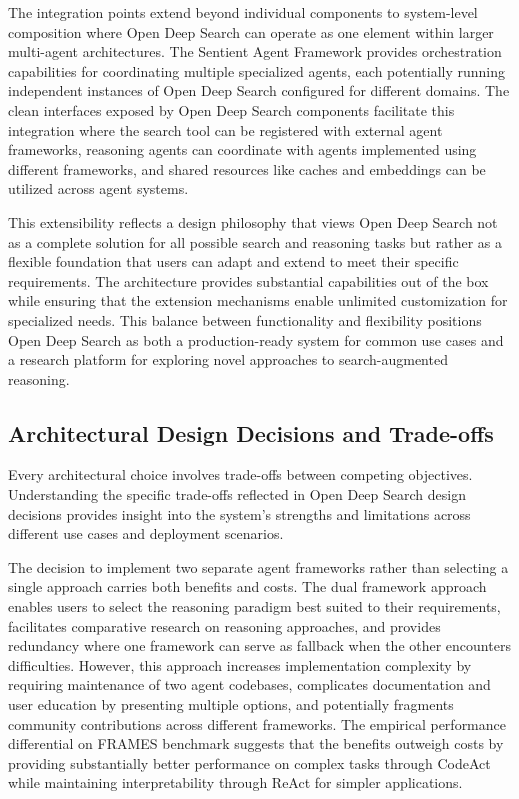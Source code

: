 The integration points extend beyond individual components to system-level composition where Open Deep Search can operate as one element within larger multi-agent architectures. The Sentient Agent Framework provides orchestration capabilities for coordinating multiple specialized agents, each potentially running independent instances of Open Deep Search configured for different domains. The clean interfaces exposed by Open Deep Search components facilitate this integration where the search tool can be registered with external agent frameworks, reasoning agents can coordinate with agents implemented using different frameworks, and shared resources like caches and embeddings can be utilized across agent systems.

This extensibility reflects a design philosophy that views Open Deep Search not as a complete solution for all possible search and reasoning tasks but rather as a flexible foundation that users can adapt and extend to meet their specific requirements. The architecture provides substantial capabilities out of the box while ensuring that the extension mechanisms enable unlimited customization for specialized needs. This balance between functionality and flexibility positions Open Deep Search as both a production-ready system for common use cases and a research platform for exploring novel approaches to search-augmented reasoning.

\subsection{Architectural Design Decisions and Trade-offs}

Every architectural choice involves trade-offs between competing objectives. Understanding the specific trade-offs reflected in Open Deep Search design decisions provides insight into the system's strengths and limitations across different use cases and deployment scenarios.

The decision to implement two separate agent frameworks rather than selecting a single approach carries both benefits and costs. The dual framework approach enables users to select the reasoning paradigm best suited to their requirements, facilitates comparative research on reasoning approaches, and provides redundancy where one framework can serve as fallback when the other encounters difficulties. However, this approach increases implementation complexity by requiring maintenance of two agent codebases, complicates documentation and user education by presenting multiple options, and potentially fragments community contributions across different frameworks. The empirical performance differential on FRAMES benchmark suggests that the benefits outweigh costs by providing substantially better performance on complex tasks through CodeAct while maintaining interpretability through ReAct for simpler applications.

